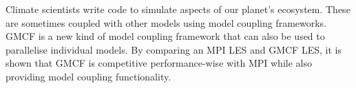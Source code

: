 Climate scientists write code to simulate aspects of our planet's ecosystem.
These are sometimes coupled with other models using model coupling frameworks.
GMCF is a new kind of model coupling framework that can also be used to
parallelise individual models. By comparing an MPI LES and GMCF LES, it is shown
that GMCF is competitive performance-wise with MPI while also providing model
coupling functionality.
